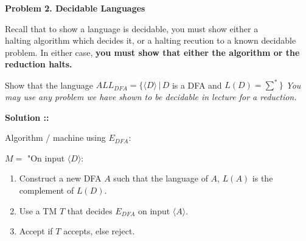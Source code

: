 \documentclass[11pt]{article}
\begin{document}
\begin{enumerate}[a)]
\begin{center}
    \end{center}
\end{enumerate}



\pagebreak


\textbf{Problem 2. Decidable Languages}

Recall that to show a language is decidable, you must show either a \\halting algorithm
which decides it, or a halting recution to a known decidable problem. In either case,
\textbf{you must show that either the algorithm or the reduction halts.}

\vspace{10px}Show that the language $ALL_{DFA}=\{\langle D\rangle \,|\, D$
is a DFA and $L(D)=\sum^*$$\}$ \textit{You may use any problem we have shown to be
decidable in lecture for a reduction.}

\vspace{5px}\textbf{Solution ::}

Algorithm / machine using $E_{DFA}$:

$M = $ "On input $\langle D\rangle$:
\begin{enumerate}[\hspace{15px}1.]
    \item
    Construct a new DFA $A$ such that the language of $A$, $L(A)$ is the
    complement of $L(D)$.
    \item
    Use a TM $T$ that decides $E_{DFA}$ on input $\langle A\rangle$.
    \item 
    Accept if $T$ accepts, else reject.
\end{enumerate}
\end{document}
